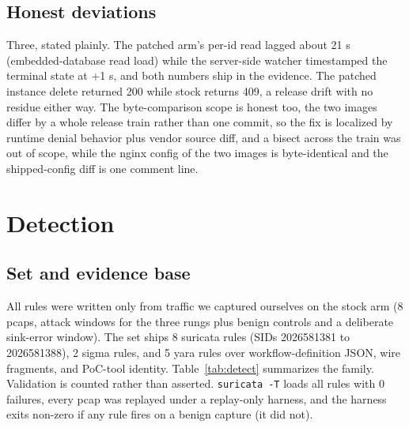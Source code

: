 \documentclass[journal]{IEEEtran}
\begin{document}
\subsection{Honest deviations}

Three, stated plainly. The patched arm's per-id read lagged about 21 s
(embedded-database read load) while the server-side watcher timestamped the
terminal state at +1 s, and both numbers ship in the evidence. The patched
instance delete returned 200 while stock returns 409, a release drift with no
residue either way. The byte-comparison scope is honest too, the two images
differ by a whole release train rather than one commit, so the fix is
localized by runtime denial behavior plus vendor source diff, and a bisect
across the train was out of scope, while the nginx
config of the two images is byte-identical and the shipped-config diff is one
comment line.
\section{Detection}
\label{sec:detection}

\subsection{Set and evidence base}

All rules were written only from traffic we captured ourselves on the stock
arm (8 pcaps, attack windows for the three rungs plus benign controls and a
deliberate sink-error window). The set ships 8 suricata rules (SIDs
2026581381 to 2026581388),
2 sigma rules,
and 5 yara rules over workflow-definition JSON, wire fragments, and PoC-tool
identity.
Table~\ref{tab:detect} summarizes the family. Validation is counted rather
than asserted. \texttt{suricata -T} loads all rules with 0 failures, every
pcap was replayed under a replay-only harness, and the harness exits non-zero
if any rule fires on a benign capture (it did not).
\end{document}
